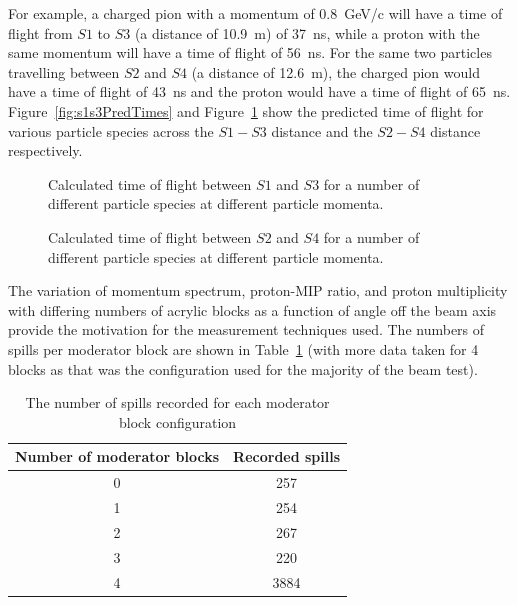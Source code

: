 For example, a charged pion with a momentum of 0.8~GeV/c will have a time of flight from $\mathit{S1}$ to $\mathit{S3}$ (a distance of 10.9~m) of 37~ns, while a proton with the same momentum will have a time of flight of 56~ns.
For the same two particles travelling between $\mathit{S2}$ and $\mathit{S4}$ (a distance of 12.6~m), the charged pion would have a time of flight of 43~ns and the proton would have a time of flight of 65~ns.
Figure~\ref{fig:s1s3PredTimes} and Figure~\ref{fig:s2s4PredTimes} show the predicted time of flight for various particle species across the $\mathit{S1}-\mathit{S3}$ distance and the $\mathit{S2}-\mathit{S4}$ distance respectively.

\begin{figure}[ht]
  \begin{minipage}[t]{0.49\textwidth}
    \begin{adjustbox}{max totalsize={\textwidth}{.5\textheight},center}
      
    \end{adjustbox}
    \caption{Calculated time of flight between $\mathit{S1}$ and $\mathit{S3}$ for a number of different particle species at different particle momenta.}
    \label{fig:s1s3PredTimes}
  \end{minipage}
  \hfill
  \begin{minipage}[t]{0.49\textwidth}
    \begin{adjustbox}{max totalsize={\textwidth}{.5\textheight},center}
      
    \end{adjustbox}
    \caption{Calculated time of flight between $\mathit{S2}$ and $\mathit{S4}$ for a number of different particle species at different particle momenta.}
    \label{fig:s2s4PredTimes}
  \end{minipage}
\end{figure}

The variation of momentum spectrum, proton-MIP ratio, and proton multiplicity with differing numbers of acrylic blocks as a function of angle off the beam axis provide the motivation for the measurement techniques used.
The numbers of spills per moderator block are shown in Table~\ref{tab:spills} (with more data taken for 4 blocks as that was the configuration used for the majority of the beam test).

\begin{table}
  \centering
  \begin{tabular}{|c|c|}
    \hline
    Number of moderator blocks & Recorded spills \\
    \hline
    0 & 257 \\
    1 & 254 \\
    2 & 267 \\
    3 & 220 \\
    4 & 3884 \\
    \hline
  \end{tabular}
  \caption{The number of spills recorded for each moderator block configuration}
  \label{tab:spills}
\end{table}

